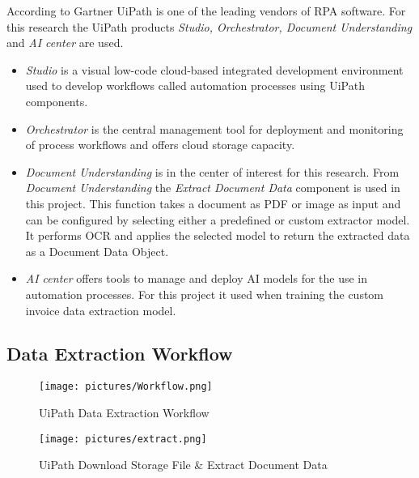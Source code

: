 According to Gartner \cite{gartner2023magicquadrant} UiPath is one of the leading vendors of \acl{RPA} software. For this research the UiPath products \textit{Studio, Orchestrator, Document Understanding} and \textit{AI center} are used. 
\begin{itemize}
    \item \textit{Studio} is a visual low-code cloud-based integrated development environment used to develop workflows called automation processes using UiPath components. 
    \item \textit{Orchestrator} is the central management tool for deployment and monitoring of process workflows and offers cloud storage capacity. 
    \item \textit{Document Understanding} is in the center of interest for this research. From \textit{Document Understanding} the \textit{Extract Document Data} component is used in this project. This function takes a document as PDF or image as input and can be configured by selecting either a predefined or custom extractor model. It performs \ac{OCR} and applies the selected model to return the extracted data as a Document Data Object.
    \item \textit{AI center} offers tools to manage and deploy \ac{AI} models for the use in automation processes. For this project it used when training the custom invoice data extraction model. \cite{uipath}
\end{itemize}

\subsection{Data Extraction Workflow}
\begin{figure}[ht]
    \centering 
    \texttt{[image: pictures/Workflow.png]}
    \caption{UiPath Data Extraction Workflow}
    \label{pic:UiPath_1}    %
\end{figure}
\begin{figure}[ht]
    \centering 
    \texttt{[image: pictures/extract.png]}
    \caption{UiPath Download Storage File \& Extract Document Data}
    \label{pic:UiPath_2}    %
\end{figure}


